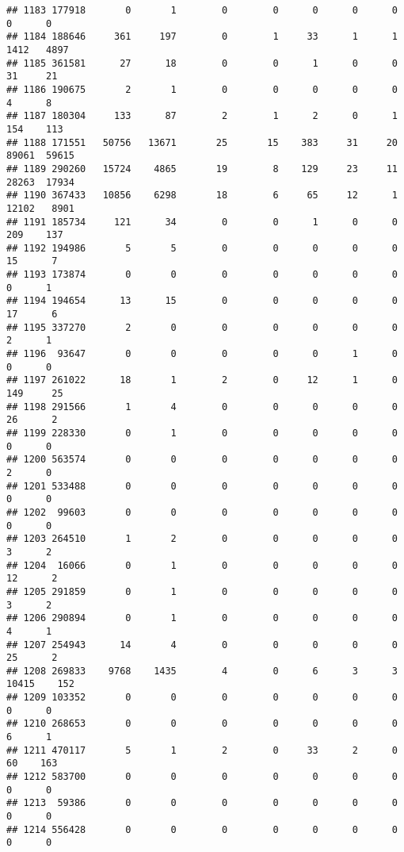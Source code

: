 \documentclass[
]{article}
\begin{document}
\begin{verbatim}
## 1183 177918       0       1        0        0      0      0      0     0      0
## 1184 188646     361     197        0        1     33      1      1  1412   4897
## 1185 361581      27      18        0        0      1      0      0    31     21
## 1186 190675       2       1        0        0      0      0      0     4      8
## 1187 180304     133      87        2        1      2      0      1   154    113
## 1188 171551   50756   13671       25       15    383     31     20 89061  59615
## 1189 290260   15724    4865       19        8    129     23     11 28263  17934
## 1190 367433   10856    6298       18        6     65     12      1 12102   8901
## 1191 185734     121      34        0        0      1      0      0   209    137
## 1192 194986       5       5        0        0      0      0      0    15      7
## 1193 173874       0       0        0        0      0      0      0     0      1
## 1194 194654      13      15        0        0      0      0      0    17      6
## 1195 337270       2       0        0        0      0      0      0     2      1
## 1196  93647       0       0        0        0      0      1      0     0      0
## 1197 261022      18       1        2        0     12      1      0   149     25
## 1198 291566       1       4        0        0      0      0      0    26      2
## 1199 228330       0       1        0        0      0      0      0     0      0
## 1200 563574       0       0        0        0      0      0      0     2      0
## 1201 533488       0       0        0        0      0      0      0     0      0
## 1202  99603       0       0        0        0      0      0      0     0      0
## 1203 264510       1       2        0        0      0      0      0     3      2
## 1204  16066       0       1        0        0      0      0      0    12      2
## 1205 291859       0       1        0        0      0      0      0     3      2
## 1206 290894       0       1        0        0      0      0      0     4      1
## 1207 254943      14       4        0        0      0      0      0    25      2
## 1208 269833    9768    1435        4        0      6      3      3 10415    152
## 1209 103352       0       0        0        0      0      0      0     0      0
## 1210 268653       0       0        0        0      0      0      0     6      1
## 1211 470117       5       1        2        0     33      2      0    60    163
## 1212 583700       0       0        0        0      0      0      0     0      0
## 1213  59386       0       0        0        0      0      0      0     0      0
## 1214 556428       0       0        0        0      0      0      0     0      0

\end{verbatim}
\end{document}
